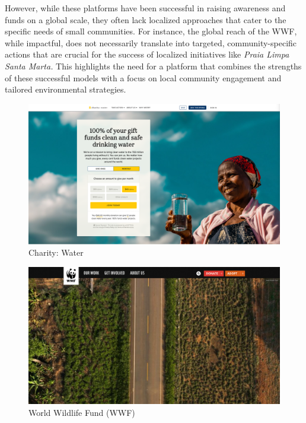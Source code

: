 However, while these platforms have been successful in raising awareness and funds on a global scale, they often lack localized approaches that cater to the specific needs of small communities. For instance, the global reach of the WWF, while impactful, does not necessarily translate into targeted, community-specific actions that are crucial for the success of localized initiatives like \textit{Praia Limpa Santa Marta.} This highlights the need for a platform that combines the strengths of these successful models with a focus on local community engagement and tailored environmental strategies.

\begin{figure}[h]
    \centering
    \includegraphics[width=1\linewidth]{images/charity_water.png}
    \caption{Charity: Water}
    \label{fig:charity_water}
\end{figure}

\begin{figure}[h]
    \centering
    \includegraphics[width=1\linewidth]{images/WWF.png}
    \caption{World Wildlife Fund (WWF)}
    \label{fig:WWF}
\end{figure}



